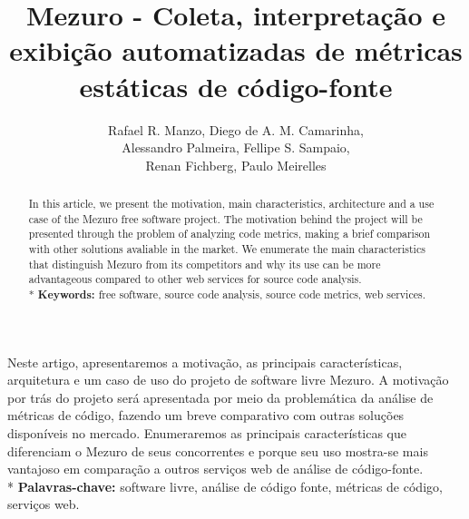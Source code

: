 \documentclass[12pt]{article}
\begin{document}
\sloppy
\title{Mezuro - Coleta, interpretação e exibição automatizadas de métricas estáticas de código-fonte}

\author{Rafael R. Manzo, Diego de A. M. Camarinha,\\
        Alessandro Palmeira, Fellipe S. Sampaio,\\
        Renan Fichberg, Paulo Meirelles}

\address{Instituto de Matemática e Estatística -- Universidade de São Paulo (USP)\\
  Rua do Matão, 1010 -- 05508-090 -- Cidade Universitária -- São Paulo -- SP -- Brasil
\nextinstitute
  Faculdade de Engenharia -- UnB Gama (FGA)\\
  Gama -- DF -- Brasil
}

\maketitle
\begin{abstract}
  In this article, we present the motivation, main characteristics, architecture and a use case of the Mezuro free software project.
  The motivation behind the project will be presented through the problem of analyzing code metrics, making a brief comparison with
  other solutions avaliable in the market.
  We enumerate the main characteristics that distinguish Mezuro from its competitors and why its use can be more advantageous compared to other
  web services for source code analysis.
  \\*
  \textbf{Keywords:} free software, source code analysis, source code metrics, web services.
\end{abstract}

\begin{resumo}
  Neste artigo, apresentaremos a motivação, as principais características, arquitetura e um caso de uso do projeto de software livre Mezuro.
  A motivação por trás do projeto será apresentada por meio da problemática da análise de métricas de código, fazendo um breve
  comparativo com outras soluções disponíveis no mercado. Enumeraremos as principais características que diferenciam
  o Mezuro de seus concorrentes e porque seu uso mostra-se mais vantajoso em comparação a outros serviços web de análise de código-fonte.
  \\*
  \textbf{Palavras-chave:} software livre, análise de código fonte, métricas de código, serviços web.
\end{resumo}
\end{document}
